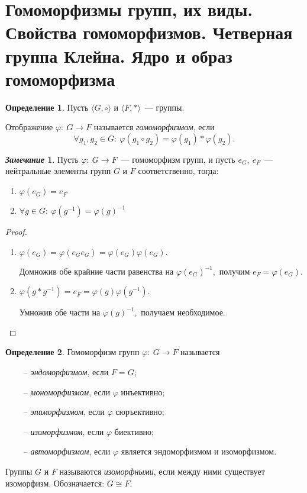 \documentclass[a4paper, 14pt]{extarticle}
\newcommand{\n}{\par}
\renewcommand{\phi}{\varphi}
\theoremstyle{definition}
\newtheorem*{remark}{\textit{Замечание}}
\newtheorem{definition}{Определение}
\theoremstyle{plain}
\numberwithin{theorem}{section}
\numberwithin{definition}{section}
\numberwithin{statement}{section}
\numberwithin{lemma}{section}
\numberwithin{consequence}{section}
\begin{document}
	\section{Гомоморфизмы групп, их виды. Свойства гомоморфизмов. Четверная группа Клейна. Ядро и образ гомоморфизма}
	\setcounter{definition}{0}
		\begin{definition}
			Пусть $\langle G, \circ \rangle$ и $\langle F, * \rangle$~--- группы.
			\n
			Отображение $\phi{:} \ G \rightarrow F$ называется \textit{гомоморфизмом}, если
			\begin{equation*}
				\forall g_1, g_2 \in G{:} \ \phi(g_1 \circ g_2) = \phi(g_1) * \phi(g_2).
			\end{equation*}
		\end{definition}
		\begin{remark}
			Пусть ${\phi{:} \ G \rightarrow F}$~--- гомоморфизм групп, и пусть ${e_G, \ e_F}$~--- нейтральные элементы групп $G$ и $F$ соответственно, тогда:
			\begin{enumerate}
				\setlength\itemsep{0.1em}
				\item $\phi(e_G) = e_F$
				\item $\forall g \in G{:} \ \phi(g^{-1}) = \phi(g)^{-1}$
			\end{enumerate}
		\end{remark}
		\begin{proof}
			\
			\begin{enumerate}
				\setlength\itemsep{0.1em}
				\item $\phi(e_G) = \phi(e_Ge_G) = \phi(e_G)\phi(e_G).$ \n
				Домножив обе крайние части равенства на $\phi(e_G)^{-1},$ получим
				${e_F = \phi(e_G).}$
				\item $\phi(g * g^{-1}) = e_F = \phi(g)\phi(g^{-1}).$ \n
				Умножив обе части на $\phi(g)^{-1},$ получаем необходимое. \qedhere
			\end{enumerate}
		\end{proof}
		\begin{definition}
			Гомоморфизм групп ${\phi{:} \ G \rightarrow F}$ называется 
			\begin{itemize}
				\item [~--] \textit{эндоморфизмом}, если $F = G$;
				\item [~--] \textit{мономорфизмом}, если $\phi$ инъективно;
				\item [~--] \textit{эпиморфизмом}, если $\phi$ сюръективно;
				\item [~--] \textit{изоморфизмом}, если $\phi$ биективно;
				\item [~--] \textit{автоморфизмом}, если $\phi$ является эндоморфизмом и изоморфизмом.
			\end{itemize} \n
			Группы $G$ и $F$ называются \textit{изоморфными}, если между ними существует изоморфизм. Обозначается: $G \cong F.$
		\end{definition}
\end{document}
